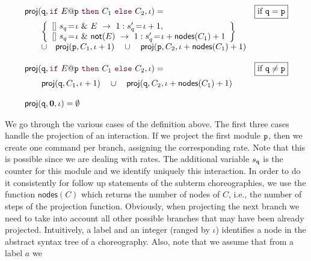 \begin{definition}
\begin{displaymath}
\begin{array}{lr}
          \proj (\role q,\ifTE {E}{p}{C_1}{C_2}, \iota) = 
          &  \boxed{\text{if }\role q=\role p}\\[2mm]
          \qquad\left\{ 
          \begin{array}{lll}
            \commandBase {} {s_{q}\!=\! \iota\ \&\ E}{\ 1: s'_{q}\!=\! \iota+1},\\ 
            \commandBase {} {s_{q}\!=\! \iota\ \&\ \mathsf{not}(E)}
            {\ 1: s'_{q}\!=\! \iota+\mathsf{nodes}(C_1)+1}
          \end{array}
          \right\}
          \\
          \qquad\cup\quad \proj (\role{p}, C_1, \iota+1)
          \quad\cup\quad
          \proj (\role{p}, C_2, \iota+\mathsf{nodes}(C_1)+1)
          \\\\

          \proj (\role q,\ifTE {E}{p}{C_1}{C_2}, \iota) = 
          &  \boxed{\text{if }\role q\neq\role p}\\[2mm]
          \qquad\proj (\role{q}, C_1, \iota+1)
          \quad\cup\quad
          \proj (\role{q}, C_2, \iota+\mathsf{nodes}(C_1)+1)

          \\\\

          \proj (\role q,\CEnd, \iota) = \emptyset

        \end{array}
      \end{displaymath}
    \end{definition}
    We go through the various cases of the definition above. The first
    three cases handle the projection of an interaction. If we project
    the first module $\mathtt{p}$, then we create one command per branch,
    assigning the corresponding rate. Note that this is possible since
    we are dealing with rates. The additional variable $s_{\mathtt{q}}$
    is the counter for this module and we identify uniquely this
    interaction. In order to do it consistently for follow up
    statements of the subterm choreographies, we use the function
    $\mathsf{nodes}(C)$ which returns the number of nodes of $C$,
    i.e., the number of steps of the projection function. Obviously,
    when projecting the next branch we need to take into account all
    other possible branches that may have been already
    projected. Intuitively, a label and an integer (ranged by $\iota$)
    identifies a node in the abstract syntax tree of a
    choreography. Also, note that we assume that from a label $a$ we
